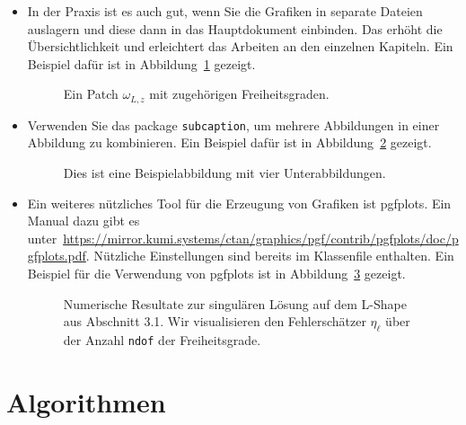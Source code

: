 \begin{itemize}
  \item In der Praxis ist es auch gut, wenn Sie die Grafiken in separate Dateien auslagern und diese dann in das Hauptdokument einbinden. Das erhöht die Übersichtlichkeit und erleichtert das Arbeiten an den einzelnen Kapiteln. Ein Beispiel dafür ist in Abbildung~\ref{fig:patch} gezeigt.
        \begin{figure}[ht!]
          \centering
          \begin{tikzpicture}
            
          \end{tikzpicture}
          \caption{Ein Patch $\omega_{L,z}$ mit zugehörigen Freiheitsgraden.}
          \label{fig:patch}
        \end{figure}

  \item Verwenden Sie das package \verb$subcaption$, um mehrere Abbildungen in einer Abbildung zu kombinieren. 
  Ein Beispiel dafür ist in Abbildung~\ref{fig:subfig-example} gezeigt.
\begin{figure}[ht!]
  \centering
  
  \caption{Dies ist eine Beispielabbildung mit vier Unterabbildungen.}
  \label{fig:subfig-example}
\end{figure}

  \item Ein weiteres nützliches Tool für die Erzeugung von Grafiken ist pgfplots. Ein Manual dazu gibt es unter~\url{https://mirror.kumi.systems/ctan/graphics/pgf/contrib/pgfplots/doc/pgfplots.pdf}. Nützliche Einstellungen sind bereits im Klassenfile enthalten. Ein Beispiel für die Verwendung von pgfplots ist in Abbildung~\ref{fig:konvergenzplot} gezeigt.

        \begin{figure}[ht!]
          \centering
          
          \caption{Numerische Resultate zur singulären Lösung auf dem
            L-Shape aus Abschnitt 3.1. Wir visualisieren den Fehlerschätzer $\eta_\ell$ über der
            Anzahl \texttt{ndof} der Freiheitsgrade.
          }
          \label{fig:konvergenzplot}
        \end{figure}
\end{itemize}

\section{Algorithmen}

